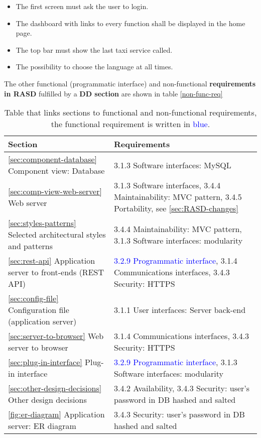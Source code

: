 \begin{itemize}
\item The first screen must ask the user to login.
\item The dashboard with links to every function shall be displayed in the home page.
\item The top bar must show the last taxi service called.
\item The possibility to choose the language at all times.
\end{itemize}

The other functional (programmatic interface) and non-functional {\bf requirements in RASD} fulfilled by a {\bf DD section} are shown in table \autoref{non-func-req}




\begin{table}[h]
\begin{center}
\begin{tabular}{|p{}|p{}|}
\hline
{\bf Section}  & {\bf Requirements}\\
\hline
\autoref{sec:component-database} Component view: Database & 
3.1.3 Software interfaces: MySQL \\
\hline
\autoref{sec:comp-view-web-server} Web server & 3.1.3 Software interfaces, 3.4.4 Maintainability: MVC pattern, 3.4.5 Portability, see \autoref{sec:RASD-changes} \\
\hline
\autoref{sec:styles-patterns} Selected architectural styles and patterns &  3.4.4 Maintainability: MVC pattern, 3.1.3 Software interfaces: modularity \\
\hline
\autoref{sec:rest-api} Application server to front-ends (REST API) &  \textcolor{blue}{3.2.9 Programmatic interface}, 3.1.4 Communications interfaces, 3.4.3 Security: HTTPS \\
\hline
\autoref{sec:config-file} Configuration file (application server) & 3.1.1 User interfaces: Server back-end \\
\hline
\autoref{sec:server-to-browser} Web server to browser & 3.1.4 Communications interfaces, 3.4.3 Security: HTTPS \\
\hline
\autoref{sec:plug-in-interface} Plug-in interface & \textcolor{blue}{3.2.9 Programmatic interface}, 3.1.3 Software interfaces: modularity \\
\hline
\autoref{sec:other-design-decisions} Other design decisions & 3.4.2 Availability, 3.4.3  Security: user's password in DB hashed and salted \\
\hline
\autoref{fig:er-diagram} Application server: ER diagram & 3.4.3 Security: user's password in DB hashed and salted \\
\hline

\end{tabular}
\caption{Table that links sections to functional and non-functional requirements, the functional requirement is written in  \textcolor{blue}{blue}.}
\label{non-func-req}
\end{center}
\end{table}

